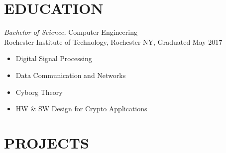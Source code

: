 \documentclass[line,mmmargin]{res}
\begin{document}
\begin{resume}
\section{EDUCATION} {\sl Bachelor of Science,} Computer Engineering \\ %
                Rochester Institute of Technology, Rochester NY, 
				Graduated May 2017 %
				\begin{multicols}{2}
					\begin{itemize}
						\itemsep -2pt
						\item[] Digital Signal Processing
						\item[] Data Communication and Networks
						\item[] Cyborg Theory
						\item[] HW \& SW Design for Crypto Applications
					\end{itemize}
				\end{multicols}
 

\section{PROJECTS}
			

\end{resume}
\end{document}
